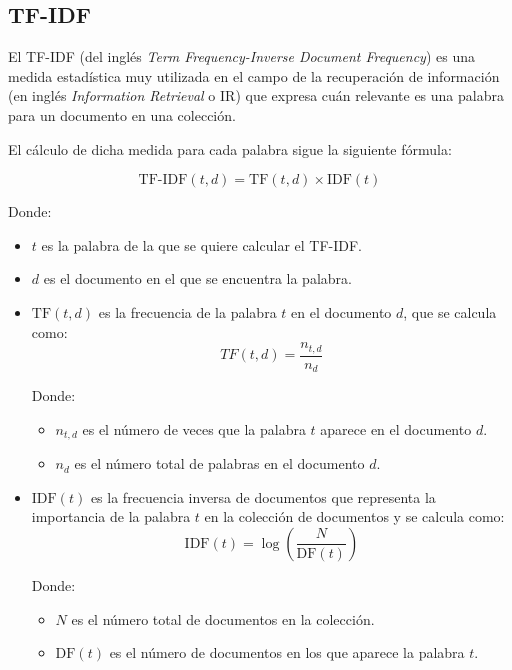 \subsection{TF-IDF}
El TF-IDF (del inglés \textit{Term Frequency-Inverse Document Frequency}) es una medida estadística muy utilizada en el campo de la recuperación de información
(en inglés \textit{Information Retrieval} o IR) que expresa cuán relevante es una palabra para un documento en una colección.

\bigskip
El cálculo de dicha medida para cada palabra sigue la siguiente fórmula:

\begin{equation}
	\label{eq:tfidf}
	\text{TF-IDF}(t,d) = \text{TF}(t,d) \times \text{IDF}(t)
\end{equation}

Donde:
\begin{itemize}
	\item $t$ es la palabra de la que se quiere calcular el TF-IDF.
	\item $d$ es el documento en el que se encuentra la palabra.
	\item $\text{TF}(t,d)$ es la frecuencia de la palabra $t$ en el documento $d$, que se calcula como:
	      \begin{equation}
		      \label{eq:tf}
		      TF(t,d) = \frac{n_{t,d}}{n_d}
	      \end{equation}

	      Donde:
	      \begin{itemize}
		      \item $n_{t,d}$ es el número de veces que la palabra $t$ aparece en el documento $d$.
		      \item $n_d$ es el número total de palabras en el documento $d$.
	      \end{itemize}

	\item $\text{IDF}(t)$ es la frecuencia inversa de documentos que representa la importancia de la palabra $t$ en la colección de documentos y
	      se calcula como:
	      \begin{equation}
		      \label{eq:idf}
		      \text{IDF}(t) = \log \left(\frac{N}{\text{DF}(t)}\right)
	      \end{equation}

	      Donde:
	      \begin{itemize}
		      \item $N$ es el número total de documentos en la colección.
		      \item $\text{DF}(t)$ es el número de documentos en los que aparece la palabra $t$.
	      \end{itemize}
\end{itemize}

